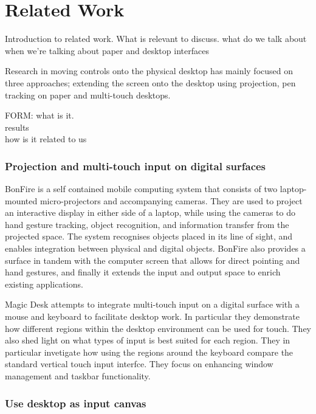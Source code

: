\chapter{Related Work} %
\label{cha:related_work}
Introduction to related work. What is relevant to discuss. what do we talk about when we're talking about paper and desktop interfaces

Research in moving controls onto the physical desktop has mainly focused on three approaches; extending the screen onto the desktop using projection, pen tracking on paper and multi-touch desktops.



FORM:
what is it. \\
results \\
how is it related to us\\
\subsection{Projection and multi-touch input on digital surfaces} %
\label{sub:projection_and_multi_touch_input_on_digital_surfaces}

BonFire \cite{kane2009bonfire} is a self contained mobile computing system that consists of two laptop-mounted micro-projectors and accompanying cameras. They are used to project an interactive display in either side of a laptop, while using the cameras to do hand gesture tracking, object recognition, and information transfer from the projected space. The system recognises objects placed in its line of sight, and enables integration between physical and digital objects. BonFire also provides a surface in tandem with the computer screen that allows for direct pointing and hand gestures, and finally it extends the input and output space to enrich existing applications.


Magic Desk \cite{bi2011magic} attempts to integrate multi-touch input on a digital surface with a mouse and keyboard to facilitate desktop work. In particular they demonstrate how different regions within the desktop environment can be used for touch. They also shed light on what types of input is best suited for each region. They in particular invetigate how using the regions around the keyboard compare the standard vertical touch  input interfce. They focus on enhancing window management and taskbar functionality.

\subsection{Use desktop as input canvas} %
\label{sub:use_desktop_as_input_canvas}


